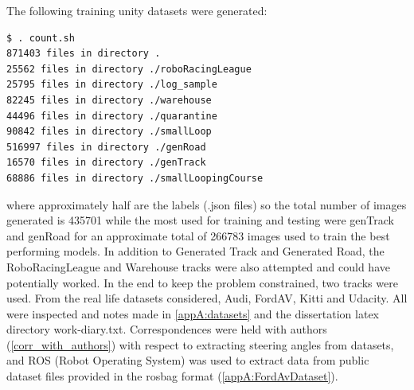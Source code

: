 The following training unity datasets were generated:
\begin{verbatim}
$ . count.sh 
871403 files in directory .
25562 files in directory ./roboRacingLeague
25795 files in directory ./log_sample
82245 files in directory ./warehouse
44496 files in directory ./quarantine
90842 files in directory ./smallLoop
516997 files in directory ./genRoad
16570 files in directory ./genTrack
68886 files in directory ./smallLoopingCourse
\end{verbatim}
where approximately half are the labels (.json files) so the total number of images generated is 435701 while the most used for training and testing were genTrack and genRoad for an approximate total of 266783 images used to train the best performing models. In addition to Generated Track and Generated Road, the RoboRacingLeague and Warehouse tracks were also attempted and could have potentially worked. In the end to keep the problem constrained, two tracks were used.
From the real life datasets considered, Audi, FordAV, Kitti and Udacity. All were inspected and notes made in \ref{appA:datasets} and the dissertation latex directory work-diary.txt. Correspondences were held with authors (\ref{corr_with_authors}) with respect to extracting steering angles from datasets, and ROS (Robot Operating System) was used to extract data from public dataset files provided in the rosbag format (\ref{appA:FordAvDataset}). 


